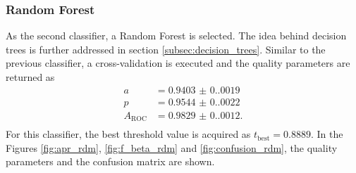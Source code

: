 \subsubsection{Random Forest}
As the second classifier, a Random Forest is selected. The idea behind decision trees is further addressed in section \ref{subsec:decision_trees}. Similar to the previous classifier,
a cross-validation is executed and the quality parameters are returned as
\begin{align*}
    a &= \num{0.9403(0.0019)} \\
    p &= \num{0.9544(0.0022)}  \\
    A_{\mathrm{ROC}} &= \num{0.9829(0.0012)}. \\
\end{align*}
For this classifier, the best threshold value is acquired as $t_{\mathrm{best}} = \num{0.8889}$. In the Figures \ref{fig:apr_rdm}, \ref{fig:f_beta_rdm} and \ref{fig:confusion_rdm}, the quality parameters
and the confusion matrix are shown.
